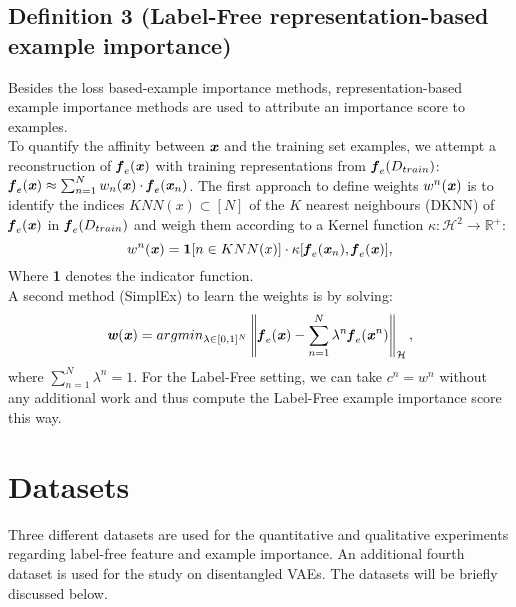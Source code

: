 \subsection{Definition 3 (Label-Free representation-based example importance)}
\label{appendix:LEIdef2}
Besides the loss based-example importance methods, representation-based example importance methods are used to attribute an importance score to examples.\\

To quantify the affinity between $\textbf{\textit{x}}$ and the training set examples, we
attempt a reconstruction of $\textbf{\textit{f}}_e(\textbf{\textit{x}})$ with training representations from $\textbf{\textit{f}}_e(D_{train})$: $\textbf{\textit{f}}_e(\textbf{\textit{x}}) \approx
\sum_{n=1}^N w_n(\textbf{\textit{x}}) \cdot \textbf{\textit{f}}_e(\textbf{\textit{x}}_n)$. The first approach \cite{papernot2018deep} to define weights $w^n(\textbf{\textit{x}})$ is to identify the indices
$KNN(x) \subset [N]$ of the $K$ nearest neighbours (DKNN) of
$\textbf{\textit{f}}_e(\textbf{\textit{x}})$ in $\textbf{\textit{f}}_e(D_{train})$ and weigh them according to a Kernel
function $\kappa : \mathcal{H}^2 \rightarrow \mathbb{R}^+$:
\begin{equation}
   w^n(\textbf{\textit{x}}) = \textbf{1} [n \in KNN(x)] \cdot \kappa [\textbf{\textit{f}}_e(\textbf{\textit{x}}_n), \textbf{\textit{f}}_e(\textbf{\textit{x}})],
\end{equation}
Where \textbf{1} denotes the indicator function.\\
A second method (SimplEx) to learn the weights \cite{crabbe2021explaining} is by solving:
\begin{equation}
    \textbf{\textit{w}}(\textbf{\textit{x}}) = argmin_{\lambda \in [0,1]^N} \left\|\textbf{\textit{f}}_e(\textbf{\textit{x}}) - \sum_{n=1}^N \lambda^n \textbf{\textit{f}}_e(\textbf{\textit{x}}^n)\right\|_\mathcal{H},
\end{equation}
where $\sum_{n=1}^N \lambda^n = 1$.
For the Label-Free setting, we can take $c^n = w^n$ without any additional work and thus compute the Label-Free example importance score this way.

\newpage

\section{Datasets}
\label{app:datasets}

Three different datasets are used for the quantitative and qualitative experiments regarding label-free feature and example importance. An additional fourth dataset is used for the study on disentangled VAEs. The datasets will be briefly discussed below.


